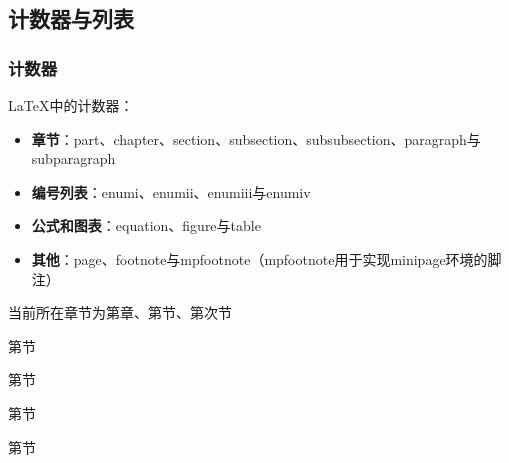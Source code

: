     \subsection{计数器与列表}
        \subsubsection{计数器}
            \LaTeX 中的计数器：
            \begin{itemize}
                \item \textbf{章节}：part、chapter、section、subsection、subsubsection、paragraph与subparagraph
                \item \textbf{编号列表}：enumi、enumii、enumiii与enumiv
                \item \textbf{公式和图表}：equation、figure与table
                \item \textbf{其他}：page、footnote与mpfootnote（mpfootnote用于实现minipage环境的脚注）
            \end{itemize}

            当前所在章节为第\thesection 章、第\thesubsection 节、第\thesubsubsection 次节

            第节 %

            第节 %

            第节 %

            第节 %

